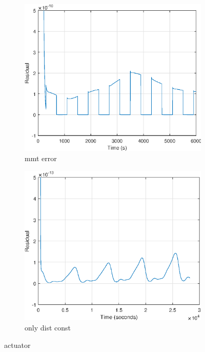 
\begin{figure}[H]
	\begin{subfigure}{0.5\linewidth}
	\centering
	\includegraphics[width=1\linewidth]{figures/mt_fault_res}
	\caption{mmt error}
	\label{fig:residualmt}
	\end{subfigure}
	\begin{subfigure}{0.5\linewidth}
	\centering
	\includegraphics[width=1\linewidth]{figures/constdistonly_res}
	\caption{only dist const}
	\label{fig:residualdist}	
	\end{subfigure}
\caption{actuator}
\end{figure}

